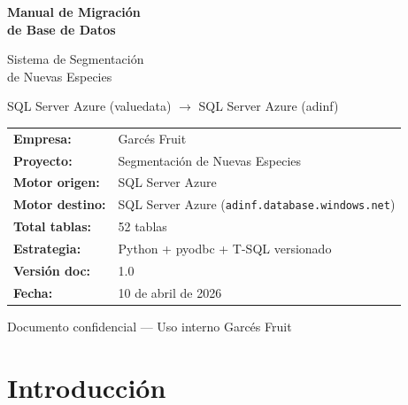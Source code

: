 \documentclass[12pt,a4paper,twoside]{report}
\begin{document}
\begin{titlepage}
\centering
\vspace*{2cm}

{\Huge\bfseries\color{garcesdark} Manual de Migraci\'on\\[0.3cm] de Base de Datos\par}
\vspace{1cm}
{\LARGE\color{garcesgreen} Sistema de Segmentaci\'on\\de Nuevas Especies\par}
\vspace{0.5cm}
{\large\color{gray} SQL Server Azure (valuedata) $\rightarrow$ SQL Server Azure (adinf)\par}

\vspace{2cm}

\begin{tcolorbox}[colback=codebg, colframe=garcesgreen, width=12cm, arc=5pt]
\centering
\begin{tabular}{ll}
\textbf{Empresa:} & Garc\'es Fruit \\
\textbf{Proyecto:} & Segmentaci\'on de Nuevas Especies \\
\textbf{Motor origen:} & SQL Server Azure \\
\textbf{Motor destino:} & SQL Server Azure (\texttt{adinf.database.windows.net}) \\
\textbf{Total tablas:} & 52 tablas \\
\textbf{Estrategia:} & Python + pyodbc + T-SQL versionado \\
\textbf{Versi\'on doc:} & 1.0 \\
\textbf{Fecha:} & 10 de abril de 2026 \\
\end{tabular}
\end{tcolorbox}

\vfill
{\small\color{gray} Documento confidencial --- Uso interno Garc\'es Fruit\par}
\end{titlepage}

\tableofcontents
\newpage
\listoftables
\lstlistoflistings
\newpage

\chapter{Introducci\'on}
\end{document}
